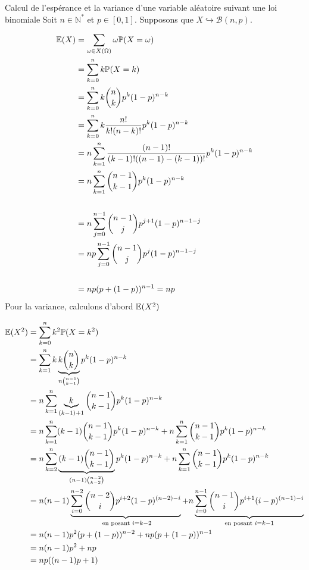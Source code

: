 \documentclass{article}
\begin{document}
\begin{question_kholle}{Calcul de l'espérance et la variance d'une variable aléatoire suivant une loi binomiale}
	Soit $n \in \mathbb{N}^*$ et $p \in [0, 1]$.
	Supposons que $X \hookrightarrow \mathcal{B}(n, p)$.
	
	\begin{align*}
		\mathbb E(X) &= \sum_{\omega \in X(\Omega)}\omega \mathbb P(X = \omega) \\
		& = \sum_{k=0}^{n}k\mathbb P(X=k) \\
		&= \sum_{k=0}^{n}k \binom{n}{k} p^{k}(1-p)^{n-k} \\
		&= \sum_{k=0}^{n}k \frac{n!}{k! (n-k)!} p^{k}(1-p)^{n-k} \\
		&= n \sum_{k=1}^{n} \frac{(n-1)!}{(k-1)! ((n-1)-(k-1))!} p^{k}(1-p)^{n-k} \\
		&= n \sum_{k=1}^{n} \binom{n-1}{k-1} p^{k}(1-p)^{n-k} \\ \\
		&= n \sum_{j=0}^{n-1} \binom{n-1}{j} p^{j+1}(1-p)^{n-1-j} \\
		&= n p \sum_{j=0}^{n-1} \binom{n-1}{j} p^{j}(1-p)^{n-1-j} \\ \\
		&= np (p + (1-p))^{n-1} = np
	\end{align*}
	Pour la variance, calculons d'abord $\mathbb E(X^{2})$
	
	\begin{align*}
		\mathbb E(X^{2}) &= \sum _{k=0}^{n}k^{2} \mathbb P(X=k^{2}) \\
		&=  \sum_{k=1}^{n} k \underbrace{ k \binom{n}{k} }_{ n \binom{n-1}{k-1} }p^{k}(1-p)^{n-k} \\
		&= n \sum_{k=1}^{n} \underbrace{ k }_{ (k-1)+1 } \binom{n-1}{k-1} p^{k}(1-p)^{n-k} \\
		&= n \sum_{k=1}^{n}(k-1)\binom{n-1}{k-1}p^{k}(1-p)^{n-k}+ n \sum_{k=1}^{n}\binom{n-1}{k-1}p^{k}(1-p)^{n-k} \\
		&= n \sum_{k=2}^{n}\underbrace{ (k-1)\binom{n-1}{k-1} }_{ (n-1)\binom{n-2}{k-2} } p^{k}(1-p)^{n-k} + n \sum_{k=1}^{n}\binom{n-1}{k-1}p^{k}(1-p)^{n-k} \\
		&= n(n-1) \underbrace{ \sum_{i=0}^{n-2}\binom{n-2}{i}p^{i+2}(1-p)^{(n-2)-i}  }_{ \text{ en posant } i = k-2 }+ n \underbrace{ \sum_{i=0}^{n-1}\binom{n-1}{i}p^{i+1}(i-p)^{(n-1)-i} }_{ \text{en posant }i=k-1 } \\
		&= n(n-1)p^{2}(p+(1-p))^{n-2} + np(p+(1-p))^{n-1} \\
		&= n(n-1)p^{2}+np \\
		&= np((n-1)p+1)
	\end{align*}
	

\end{question_kholle}
\end{document}

